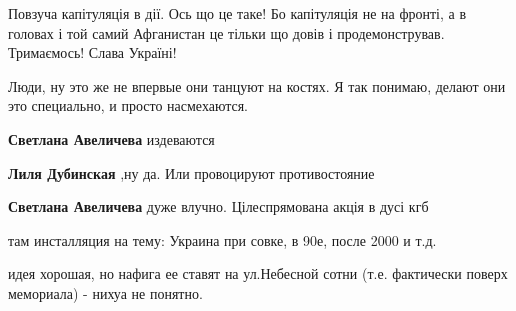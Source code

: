 \begin{itemize}
Повзуча капітуляція в дії. Ось що це таке! Бо капітуляція не на фронті, а в
головах і той самий Афганистан це тільки що довів і продемонстрував.
Тримаємось! Слава Україні!


 

Люди, ну это же не впервые они танцуют на костях. Я так понимаю, делают они это
специально, и просто насмехаются.

\begin{itemize}
 
\textbf{Светлана Авеличева} издеваются

 
\textbf{Лиля Дубинская} ,ну да. Или провоцируют противостояние

 
\textbf{Светлана Авеличева} дуже влучно. Цілеспрямована акція в дусі кгб
\end{itemize}

 

там инсталляция на тему: Украина при совке, в 90е, после 2000 и т.д.

идея хорошая, но нафига ее ставят на ул.Небесной сотни (т.е. фактически поверх
мемориала) - нихуа не понятно.

\begin{itemize}
 

\end{itemize}
\end{itemize}
